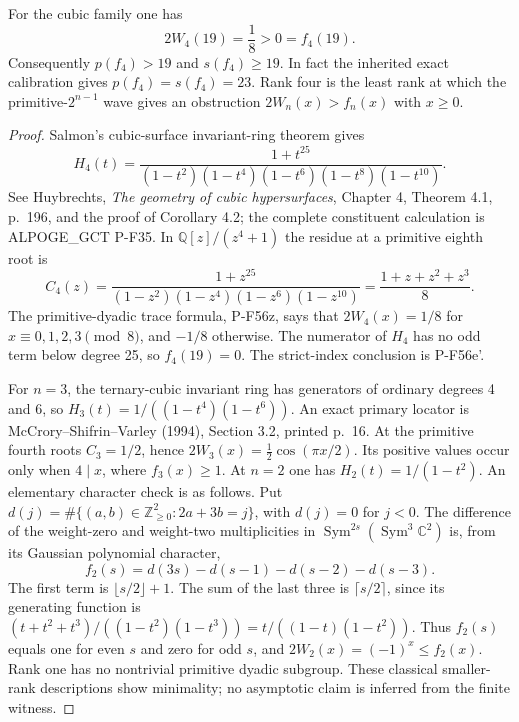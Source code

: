 \begin{proposition}
For the cubic family one has
\[
                  2W_4(19)=\frac18>0=f_4(19).
\]
Consequently $p(f_4)>19$ and $s(f_4)\ge19$.  In fact the inherited
exact calibration gives $p(f_4)=s(f_4)=23$.  Rank four is the least
rank at which the primitive-$2^{n-1}$ wave gives an obstruction
$2W_n(x)>f_n(x)$ with $x\ge0$.
\end{proposition}
\begin{proof}
Salmon's cubic-surface invariant-ring theorem gives
\[
 H_4(t)=\frac{1+t^{25}}{(1-t^2)(1-t^4)(1-t^6)(1-t^8)(1-t^{10})}.
\]
See Huybrechts, \emph{The geometry of cubic hypersurfaces}, Chapter 4,
Theorem 4.1, p.\ 196, and the proof of Corollary 4.2; the complete
constituent calculation is ALPOGE\_GCT P-F35.  In
$\mathbb Q[z]/(z^4+1)$ the residue at a primitive eighth root is
\[
 C_4(z)=\frac{1+z^{25}}{(1-z^2)(1-z^4)(1-z^6)(1-z^{10})}
       =\frac{1+z+z^2+z^3}{8}.
\]
The primitive-dyadic trace formula, P-F56z, says that
$2W_4(x)=1/8$ for $x\equiv0,1,2,3\pmod8$, and $-1/8$ otherwise.
The numerator of $H_4$ has no odd term below degree 25, so
$f_4(19)=0$.  The strict-index conclusion is P-F56e'.

For $n=3$, the ternary-cubic invariant ring has generators of
ordinary degrees 4 and 6, so $H_3(t)=1/((1-t^4)(1-t^6))$.
An exact primary locator is McCrory--Shifrin--Varley (1994),
Section 3.2, printed p.~16.
At the primitive fourth roots $C_3=1/2$, hence
$2W_3(x)=\tfrac12\cos(\pi x/2)$.  Its positive values occur only
when $4\mid x$, where $f_3(x)\ge1$.  At $n=2$ one has
$H_2(t)=1/(1-t^2)$.  An elementary character check is as follows.
Put $d(j)=\#\{(a,b)\in\mathbb Z_{\ge0}^2:2a+3b=j\}$, with
$d(j)=0$ for $j<0$.  The difference of the weight-zero and
weight-two multiplicities in $\operatorname{Sym}^{2s}
(\operatorname{Sym}^3\mathbb C^2)$ is, from its Gaussian
polynomial character,
\[
 f_2(s)=d(3s)-d(s-1)-d(s-2)-d(s-3).
\]
The first term is $\lfloor s/2\rfloor+1$.  The sum of the last
three is $\lceil s/2\rceil$, since its generating function is
$(t+t^2+t^3)/((1-t^2)(1-t^3))=t/((1-t)(1-t^2))$.
Thus $f_2(s)$ equals one for even $s$ and zero for odd $s$, and
$2W_2(x)=(-1)^x\le f_2(x)$.  Rank one has no nontrivial primitive
dyadic subgroup.  These classical smaller-rank descriptions show
minimality; no asymptotic claim is inferred from the finite witness.
\end{proof}

